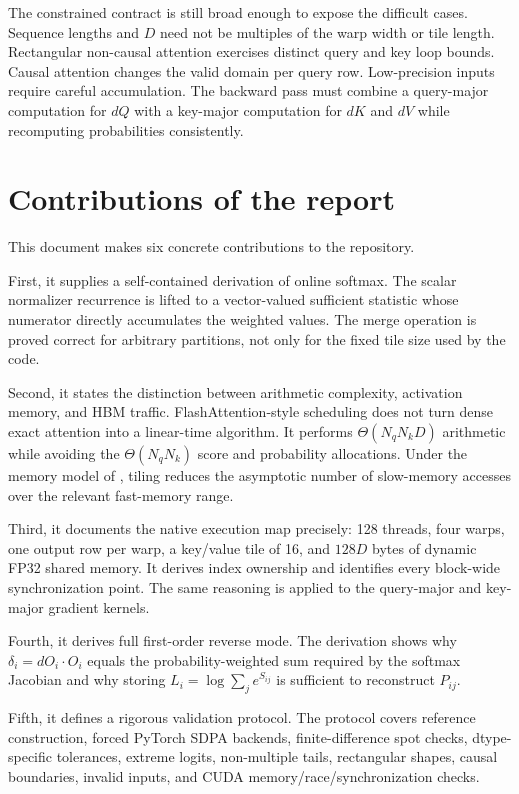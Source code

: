 The constrained contract is still broad enough to expose the difficult cases. Sequence lengths and $D$ need not be multiples of the warp width or tile length. Rectangular non-causal attention exercises distinct query and key loop bounds. Causal attention changes the valid domain per query row. Low-precision inputs require careful accumulation. The backward pass must combine a query-major computation for $dQ$ with a key-major computation for $dK$ and $dV$ while recomputing probabilities consistently.

\section{Contributions of the report}

This document makes six concrete contributions to the repository.

First, it supplies a self-contained derivation of online softmax. The scalar normalizer recurrence is lifted to a vector-valued sufficient statistic whose numerator directly accumulates the weighted values. The merge operation is proved correct for arbitrary partitions, not only for the fixed tile size used by the code.

Second, it states the distinction between arithmetic complexity, activation memory, and HBM traffic. FlashAttention-style scheduling does not turn dense exact attention into a linear-time algorithm. It performs $\Theta(N_qN_kD)$ arithmetic while avoiding the $\Theta(N_qN_k)$ score and probability allocations. Under the memory model of \citet{dao2022flashattention}, tiling reduces the asymptotic number of slow-memory accesses over the relevant fast-memory range.

Third, it documents the native execution map precisely: 128 threads, four warps, one output row per warp, a key/value tile of 16, and $128D$ bytes of dynamic FP32 shared memory. It derives index ownership and identifies every block-wide synchronization point. The same reasoning is applied to the query-major and key-major gradient kernels.

Fourth, it derives full first-order reverse mode. The derivation shows why $\delta_i=dO_i\cdot O_i$ equals the probability-weighted sum required by the softmax Jacobian and why storing $L_i=\log\sum_j e^{S_{ij}}$ is sufficient to reconstruct $P_{ij}$.

Fifth, it defines a rigorous validation protocol. The protocol covers reference construction, forced PyTorch SDPA backends, finite-difference spot checks, dtype-specific tolerances, extreme logits, non-multiple tails, rectangular shapes, causal boundaries, invalid inputs, and CUDA memory/race/synchronization checks.

